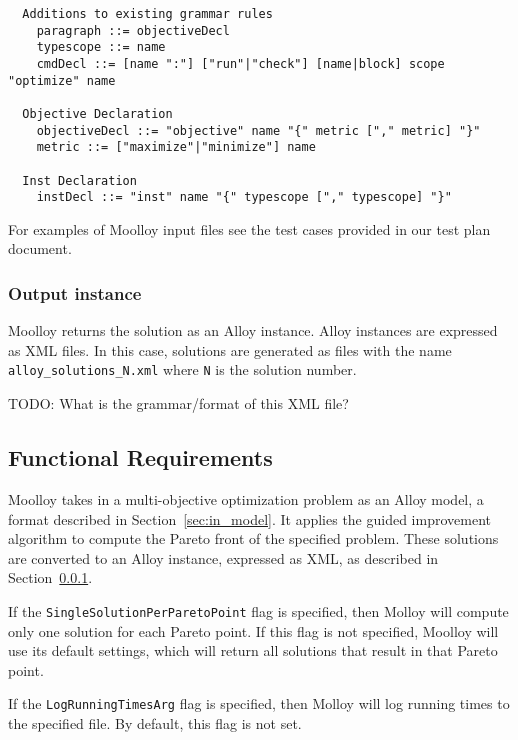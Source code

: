 \documentclass[11pt]{article}
\theoremstyle{definition}
\begin{document}
\begin{verbatim}
  Additions to existing grammar rules
    paragraph ::= objectiveDecl
    typescope ::= name
    cmdDecl ::= [name ":"] ["run"|"check"] [name|block] scope "optimize" name

  Objective Declaration
    objectiveDecl ::= "objective" name "{" metric ["," metric] "}"
    metric ::= ["maximize"|"minimize"] name

  Inst Declaration
    instDecl ::= "inst" name "{" typescope ["," typescope] "}"
\end{verbatim}

For examples of Moolloy input files see the test cases provided in
our test plan document.

\subsubsection{Output instance}\label{sec:out_model}

Moolloy returns the solution as an Alloy instance. Alloy instances are
expressed as XML files. In this case, solutions are generated as files
with the name \texttt{alloy\_solutions\_N.xml} where \texttt{N} is the
solution number.

TODO: What is the grammar/format of this XML file?

\subsection{Functional Requirements}\label{sec:func_req}

Moolloy takes in a multi-objective optimization problem as an Alloy
model, a format described in Section~\ref{sec:in_model}. It applies the
guided improvement algorithm to compute the Pareto front of the
specified problem. These solutions are converted to an Alloy instance,
expressed as XML, as described in Section~\ref{sec:out_model}.

If the \texttt{SingleSolutionPerParetoPoint} flag is specified, then
Molloy will compute only one solution for each Pareto point. If this
flag is not specified, Moolloy will use its default settings, which
will return all solutions that result in that Pareto point.

If the \texttt{LogRunningTimesArg} flag is specified, then Molloy will
log running times to the specified file. By default, this flag is not
set.
\end{document}
